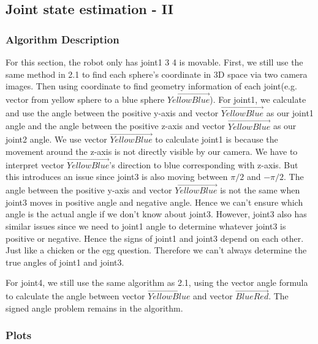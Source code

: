 \documentclass[11pt]{article}
\begin{document}
\subsection{Joint state estimation - II}

\subsubsection{Algorithm Description}

For this section, the robot only has joint1 3 4 is movable. First, we still use the same method in 2.1 to find each sphere's coordinate in 3D space via two camera images. Then using coordinate to find geometry information of each joint(e.g. vector from yellow sphere to a blue sphere $\Vec{Yellow Blue}$). For joint1, we calculate and use the angle between the positive y-axis and vector $\Vec{Yellow Blue}$ as our joint1 angle and the angle between the positive z-axis and vector $\Vec{Yellow Blue}$ as our joint2 angle. We use vector $\Vec{Yellow Blue}$ to calculate joint1 is because the movement around the z-axis is not directly visible by our camera. We have to interpret vector $\Vec{Yellow Blue}$'s direction to blue corresponding with z-axis. But this introduces an issue since joint3 is also moving between $\pi/2$  and $-\pi/2$. The angle between the positive y-axis and vector $\Vec{Yellow Blue}$ is not the same when joint3 moves in positive angle and negative angle. Hence we can't ensure which angle is the actual angle if we don't know about joint3. However, joint3 also has similar issues since we need to joint1 angle to determine whatever joint3 is positive or negative. Hence the signs of joint1 and joint3 depend on each other. Just like a chicken or the egg question. Therefore we can't always determine the true angles of joint1 and joint3.

For joint4, we still use the same algorithm as 2.1, using the vector angle formula to calculate the angle between vector $\Vec{Yellow Blue}$ and vector $\Vec{Blue Red}$. The signed angle problem remains in the algorithm.

\subsubsection{Plots}
\end{document}
